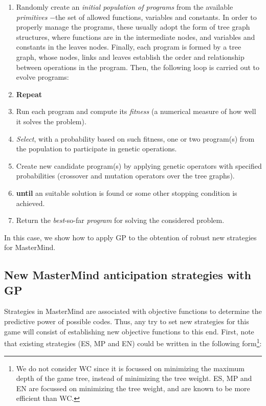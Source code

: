 \begin{enumerate}
\item Randomly create an \emph{initial population of programs} from the available \emph{primitives} $-$the set of allowed functions, variables and constants. In order to properly manage the programs, these usually adopt the form of tree graph structures, where functions are in the intermediate nodes, and variables and constants in the leaves nodes. Finally, each program is formed by a tree graph, whose nodes, links and leaves establish the order and relationship between operations in the program. Then, the following loop is carried out to evolve programs:

\item \textbf{Repeat}

\item Run each program and compute its \emph{fitness} (a numerical measure of how well it solves the problem).

\item \emph{Select}, with a probability based on such fitness, one or two program(s) from the population to participate in genetic operations.

\item Create new candidate program(s) by applying genetic operators with specified probabilities (crossover and mutation operators over the tree graphs).

\item \textbf{until} an suitable solution is found or some other stopping condition is achieved.

\item Return the \emph{best}-so-far \emph{program} for solving the considered problem.

\end{enumerate}

In this case, we show how to apply GP to the obtention of robust new strategies for MasterMind.

\subsection{New MasterMind anticipation strategies with GP}

Strategies in MasterMind are associated with objective functions to determine the predictive power of possible codes. Thus, any try to set new strategies for this game will consist of establishing new objective functions to this end. First, note that existing strategies (ES, MP and EN) could be written in the following form\footnote{We do not consider WC since it is focussed on minimizing the maximum depth of the game tree, instead of minimizing the tree weight. ES, MP and EN are focussed on minimizing the tree weight, and are known to be more efficient than WC.}:

